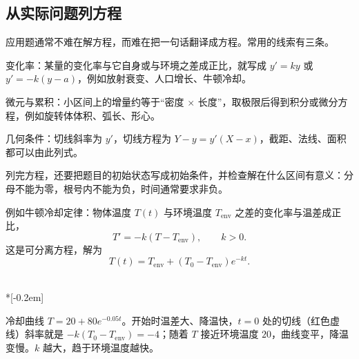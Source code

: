 \subsection{从实际问题列方程}

应用题通常不难在解方程，而难在把一句话翻译成方程。常用的线索有三条。

变化率：某量的变化率与它自身或与环境之差成正比，就写成 $y'=ky$ 或 $y'=-k(y-a)$，例如放射衰变、人口增长、牛顿冷却。

微元与累积：小区间上的增量约等于“密度 $\times$ 长度”，取极限后得到积分或微分方程，例如旋转体体积、弧长、形心。

几何条件：切线斜率为 $y'$，切线方程为 $Y-y=y'(X-x)$，截距、法线、面积都可以由此列式。

列完方程，还要把题目的初始状态写成初始条件，并检查解在什么区间有意义：分母不能为零，根号内不能为负，时间通常要求非负。

例如牛顿冷却定律：物体温度 $T(t)$ 与环境温度 $T_{\mathrm{env}}$ 之差的变化率与温差成正比，
\[
  T'=-k(T-T_{\mathrm{env}}),\qquad k>0.
\]
这是可分离方程，解为
\[
  T(t)=T_{\mathrm{env}}+(T_0-T_{\mathrm{env}})e^{-kt}.
\]

\begin{center}
\\*[-0.2em]
\parbox{0.86\linewidth}{\centering\footnotesize
冷却曲线 $T=20+80e^{-0.05t}$。开始时温差大、降温快，$t=0$ 处的切线（红色虚线）斜率就是 $-k(T_0-T_{\mathrm{env}})=-4$；随着 $T$ 接近环境温度 $20$，曲线变平，降温变慢。$k$ 越大，趋于环境温度越快。}
\end{center}

\newpage

